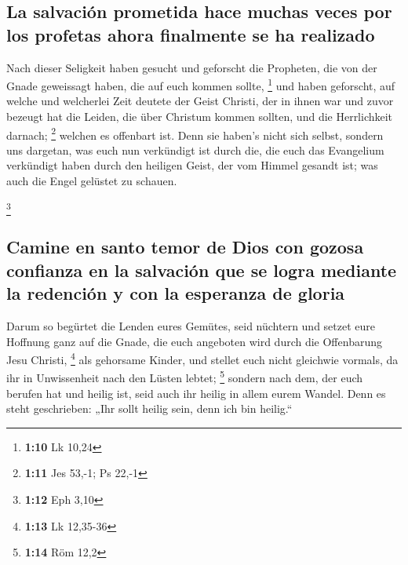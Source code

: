 \hypertarget{la-salvaciuxf3n-prometida-hace-muchas-veces-por-los-profetas-ahora-finalmente-se-ha-realizado}{%
\subsection{La salvación prometida hace muchas veces por los profetas
ahora finalmente se ha
realizado}\label{la-salvaciuxf3n-prometida-hace-muchas-veces-por-los-profetas-ahora-finalmente-se-ha-realizado}}

 Nach dieser Seligkeit haben gesucht und geforscht die
Propheten, die von der Gnade geweissagt haben, die auf euch kommen
sollte, \footnote{\textbf{1:10} Lk 10,24}  und haben
geforscht, auf welche und welcherlei Zeit deutete der Geist Christi, der
in ihnen war und zuvor bezeugt hat die Leiden, die über Christum kommen
sollten, und die Herrlichkeit darnach; \footnote{\textbf{1:11} Jes
  53,-1; Ps 22,-1}  welchen es offenbart ist. Denn sie
haben's nicht sich selbst, sondern uns dargetan, was euch nun verkündigt
ist durch die, die euch das Evangelium verkündigt haben durch den
heiligen Geist, der vom Himmel gesandt ist; was auch die Engel gelüstet
zu schauen.

\footnote{\textbf{1:12} Eph 3,10}

\hypertarget{camine-en-santo-temor-de-dios-con-gozosa-confianza-en-la-salvaciuxf3n-que-se-logra-mediante-la-redenciuxf3n-y-con-la-esperanza-de-gloria}{%
\subsection{Camine en santo temor de Dios con gozosa confianza en la
salvación que se logra mediante la redención y con la esperanza de
gloria}\label{camine-en-santo-temor-de-dios-con-gozosa-confianza-en-la-salvaciuxf3n-que-se-logra-mediante-la-redenciuxf3n-y-con-la-esperanza-de-gloria}}

 Darum so begürtet die Lenden eures Gemütes, seid
nüchtern und setzet eure Hoffnung ganz auf die Gnade, die euch angeboten
wird durch die Offenbarung Jesu Christi, \footnote{\textbf{1:13} Lk
  12,35-36}  als gehorsame Kinder, und stellet euch nicht
gleichwie vormals, da ihr in Unwissenheit nach den Lüsten lebtet;
\footnote{\textbf{1:14} Röm 12,2}  sondern nach dem, der
euch berufen hat und heilig ist, seid auch ihr heilig in allem eurem
Wandel.  Denn es steht geschrieben: „Ihr sollt heilig
sein, denn ich bin heilig.``

